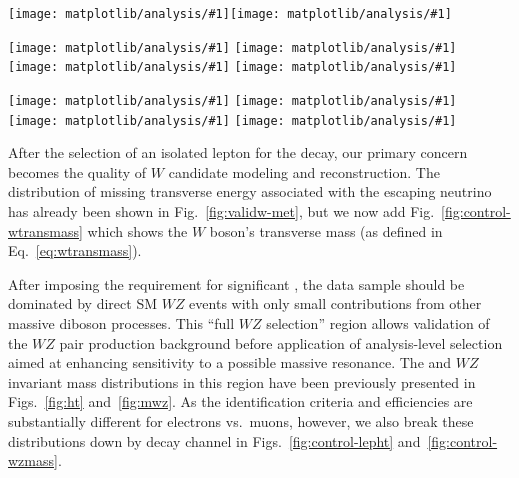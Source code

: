 {\newcommand{\myplot}[1]{\texttt{[image: matplotlib/analysis/\#1]}}

\begin{figure*}
  \centering
  \myplot{hWTransMass_ValidW}\hfill\myplot{hWTransMass_ValidWZCand}\\
  \caption[$W$ transverse mass distribution for two selections]{Transverse mass of the selected $W$ candidate before the \MET requirement is applied (left) and after (right).}
  \label{fig:control-wtransmass}
\end{figure*}

\begin{figure*}
  \centering
  \myplot{hHT_3e}\hfill
  \myplot{hHT_2e}\\
  \myplot{hHT_2mu}\hfill
  \myplot{hHT_3mu}\\
  \caption{Distribution of \lepht{} after the \MET requirement is applied, shown separately for each of the four decay channels.}
  \label{fig:control-lepht}
\end{figure*}

\begin{figure*}
  \centering
  \myplot{hWZ3e0muMass_ValidWZCand}\hfill
  \myplot{hWZ2e1muMass_ValidWZCand}\\
  \myplot{hWZ1e2muMass_ValidWZCand}\hfill
  \myplot{hWZ0e3muMass_ValidWZCand}\\
  \caption{Mass of the $WZ$ candidate after the \MET requirement is applied, shown separately for each of the four decay channels.}
  \label{fig:control-wzmass}
\end{figure*}

} %

After the selection of an isolated lepton for the \wtolnu decay, our primary concern becomes the quality of $W$ candidate modeling and reconstruction.  The distribution of missing transverse energy associated with the escaping neutrino has already been shown in Fig.~\ref{fig:validw-met}, but we now add Fig.~\ref{fig:control-wtransmass} which shows the $W$ boson's transverse mass (as defined in Eq.~\ref{eq:wtransmass}).

After imposing the requirement for significant \MET, the data sample should be dominated by direct SM $WZ$ events with only small contributions from other massive diboson processes.  This ``full $WZ$ selection'' region allows validation of the $WZ$ pair production background before application of analysis-level selection aimed at enhancing sensitivity to a possible massive resonance.  The \lepht{} and $WZ$ invariant mass distributions in this region have been previously presented in Figs.~\ref{fig:ht} and~\ref{fig:mwz}.  As the identification criteria and efficiencies are substantially different for electrons vs.\ muons, however, we also break these distributions down by decay channel in Figs.~\ref{fig:control-lepht} and~\ref{fig:control-wzmass}.

